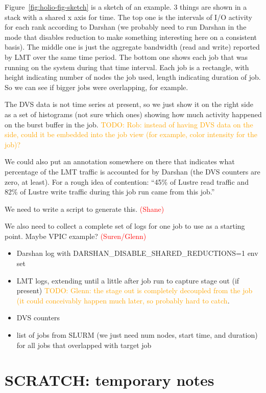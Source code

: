 \documentclass[conference,10pt,compsocconf]{IEEEtran}
\newcommand{\assign}[1]{\textcolor{red}{(#1)}}
\newcommand{\todo}[1]{\textcolor{Orange}{TODO: #1}}
\begin{document}
Figure~\ref{fig:holio-fig-sketch} is a sketch of an example.  3 things
are shown in a stack with a shared x axis for time.  The top one is
the intervals of I/O activity for each rank according to Darshan (we probably
need to run Darshan in the mode that disables reduction to make something
interesting here on a consistent basis).  The middle one is just the
aggregate bandwidth (read and write) reported by LMT over the same time
period.  The bottom one shows each job that was running on the system during
that time interval.  Each job is a rectangle, with height indicating number
of nodes the job used, length indicating duration of job.  So we can see if
bigger jobs were overlapping, for example.

The DVS data is not time series at present, so we just show it on the right
side as a set of histograms (not sure which ones) showing how much activity
happened on the burst buffer in the job.
\todo{Rob: instead of having DVS data on the side, could it be embedded into the
job view (for example, color intensity for the job)?}

We could also put an annotation somewhere on there that indicates what
percentage of the LMT traffic is accounted for by Darshan (the DVS counters
are zero, at least).  For a rough idea of contention: ``45\% of Lustre read
traffic and 82\% of Lustre write traffic during this job run came from this
job.''

We need to write a script to generate this. \assign{Shane}

We also need to collect a complete set of logs for one job to use as a
starting point.  Maybe VPIC example? \assign{Suren/Glenn}
\begin{itemize}
\item Darshan log with DARSHAN\_DISABLE\_SHARED\_REDUCTIONS=1 env set
\item LMT logs, extending until a little after job run to capture stage out
(if present) \todo{Glenn: the stage out is completely decoupled from the job
(it could conceivably happen much later, so probably hard to catch}.
\item DVS counters
\item list of jobs from SLURM (we just need num nodes, start time, and
duration) for all jobs that overlapped with target job
\end{itemize}

\section{SCRATCH: temporary notes}
\end{document}
